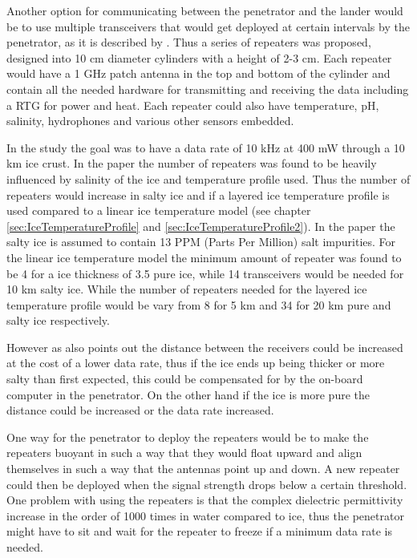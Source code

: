 Another option for communicating between the penetrator and the lander would be to use multiple transceivers that would get deployed at certain intervals by the penetrator, as it is described by \citet{iceLink-scott}. Thus a series of repeaters was proposed, designed into 10 cm diameter cylinders with a height of 2-3 cm. Each repeater would have a 1 GHz patch antenna in the top and bottom of the cylinder and contain all the needed hardware for transmitting and receiving the data including a RTG for power and heat. Each repeater could also have temperature, pH, salinity, hydrophones and various other sensors embedded.

In the study the goal was to have a data rate of 10 kHz at 400 mW through a 10 km ice crust. In the paper the number of repeaters was found to be heavily influenced by salinity of the ice and temperature profile used. Thus the number of repeaters would increase in salty ice and if a layered ice temperature profile is used compared to a linear ice temperature model (see chapter \ref{sec:IceTemperatureProfile} and \ref{sec:IceTemperatureProfile2}). In the paper the salty ice is assumed to contain 13 PPM (Parts Per Million) salt impurities. For the linear ice temperature model the minimum amount of repeater was found to be 4 for a ice thickness of 3.5 pure ice, while 14 transceivers would be needed for 10 km salty ice. While the number of repeaters needed for the layered ice temperature profile would be vary from 8 for 5 km and 34 for 20 km pure and salty ice respectively.

However as \citet{iceLink-scott} also points out the distance between the receivers could be increased at the cost of a lower data rate, thus if the ice ends up being thicker or more salty than first expected, this could be compensated for by the on-board computer in the penetrator. On the other hand if the ice is more pure the distance could be increased or the data rate increased.

One way for the penetrator to deploy the repeaters would be to make the repeaters buoyant in such a way that they would float upward and align themselves in such a way that the antennas point up and down. A new repeater could then be deployed when the signal strength drops below a certain threshold. One problem with using the repeaters is that the complex dielectric permittivity increase in the order of 1000 times in water compared to ice, thus the penetrator might have to sit and wait for the repeater to freeze if a minimum data rate is needed.

